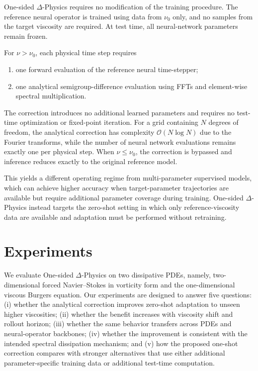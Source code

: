 \documentclass[10pt,twocolumn]{article}
\begin{document}
One-sided $\Delta$-Physics requires no modification of the training procedure.
The reference neural operator is trained using data from $\nu_0$ only, and no
samples from the target viscosity are required. At test time, all neural-network
parameters remain frozen.

For $\nu>\nu_0$, each physical time step requires
\begin{enumerate}
    \item one forward evaluation of the reference neural time-stepper;
    \item one analytical semigroup-difference evaluation using FFTs and
    element-wise spectral multiplication.
\end{enumerate}
The correction introduces no additional learned parameters and requires no
test-time optimization or fixed-point iteration. For a grid containing $N$
degrees of freedom, the analytical correction has complexity
$\mathcal{O}(N\log N)$ due to the Fourier transforms, while the number of neural
network evaluations remains exactly one per physical step. When
$\nu\le\nu_0$, the correction is bypassed and inference reduces exactly to the
original reference model.

This yields a different operating regime from multi-parameter supervised
models, which can achieve higher accuracy when target-parameter trajectories
are available but require additional parameter coverage during training.
One-sided $\Delta$-Physics instead targets the zero-shot setting in which only
reference-viscosity data are available and adaptation must be performed without
retraining.

\section{Experiments}
\label{sec:experiments}

We evaluate One-sided $\Delta$-Physics on two dissipative PDEs, namely, 
two-dimensional forced Navier--Stokes in vorticity form and the
one-dimensional viscous Burgers equation. Our experiments are designed to
answer five questions:
(i) whether the analytical correction improves zero-shot adaptation to unseen
higher viscosities;
(ii) whether the benefit increases with viscosity shift and rollout horizon;
(iii) whether the same behavior transfers across PDEs and neural-operator
backbones;
(iv) whether the improvement is consistent with the intended spectral
dissipation mechanism; and
(v) how the proposed one-shot correction compares with stronger alternatives
that use either additional parameter-specific training data or additional
test-time computation.
\end{document}
